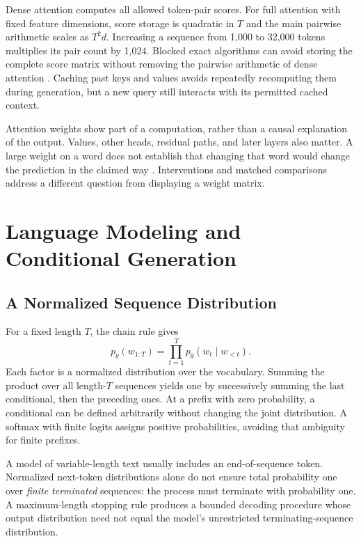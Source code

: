 Dense attention computes all allowed token-pair scores. For full attention with fixed feature dimensions, score storage is quadratic in $T$ and the main pairwise arithmetic scales as $T^2d$. Increasing a sequence from 1,000 to 32,000 tokens multiplies its pair count by 1,024. Blocked exact algorithms can avoid storing the complete score matrix without removing the pairwise arithmetic of dense attention \citep{dao2022flashattention}. Caching past keys and values avoids repeatedly recomputing them during generation, but a new query still interacts with its permitted cached context.

Attention weights show part of a computation, rather than a causal explanation of the output. Values, other heads, residual paths, and later layers also matter. A large weight on a word does not establish that changing that word would change the prediction in the claimed way \citep{jain2019attention}. Interventions and matched comparisons address a different question from displaying a weight matrix.

\section{Language Modeling and Conditional Generation}

\subsection{A Normalized Sequence Distribution}

For a fixed length $T$, the chain rule gives
\[
 p_\theta(w_{1:T})=\prod_{t=1}^{T}p_\theta(w_t\mid w_{<t}).
\]
Each factor is a normalized distribution over the vocabulary. Summing the product over all length-$T$ sequences yields one by successively summing the last conditional, then the preceding ones. At a prefix with zero probability, a conditional can be defined arbitrarily without changing the joint distribution. A softmax with finite logits assigns positive probabilities, avoiding that ambiguity for finite prefixes.

A model of variable-length text usually includes an end-of-sequence token. Normalized next-token distributions alone do not ensure total probability one over \emph{finite terminated} sequences: the process must terminate with probability one. A maximum-length stopping rule produces a bounded decoding procedure whose output distribution need not equal the model's unrestricted terminating-sequence distribution.

